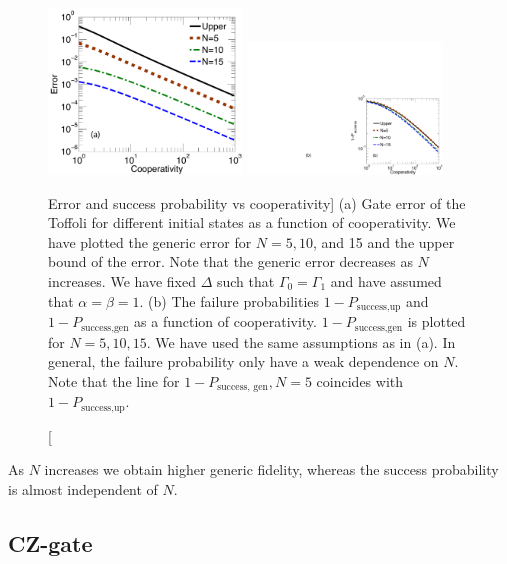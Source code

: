 \begin{figure} 
\centering
\includegraphics[width=0.46\textwidth]{./figs_Borregaard_PRL2015/figure2a}
\quad\quad
\includegraphics[width=0.46\textwidth]{./figs_Borregaard_PRL2015/figure2b}
\caption
[Error and success probability vs cooperativity]
{(a) Gate error of the Toffoli for different initial states as a
function of cooperativity. We have plotted the generic error for $N=5,10$, and 15 and the upper bound of the error. Note that the generic error decreases as $N$ increases. We have fixed $\Delta$ such that $\Gamma_{0}=\Gamma_{1}$ and have assumed that $\alpha=\beta=1$. (b) The failure probabilities $1-P_{\text{success,up}}$ and  $1-P_{\text{success,gen}}$ as a function of cooperativity. $1-P_{\text{success,gen}}$ is plotted for $N=5,10,15$. We have used the same assumptions as in (a). In general, the failure probability only have a weak dependence on $N$. Note that the line for $1-P_{\text{success, gen}},N=5$ coincides with  $1-P_{\text{success,up}}$.}
\label{fig:toffoli}
\end{figure}
As $N$ increases we obtain higher generic fidelity, whereas the success
probability is almost independent of $N$.

\subsection{CZ-gate}

